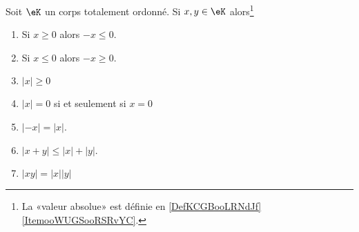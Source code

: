 \begin{lemma}  \label{LemooANTJooYxQZDw}
	Soit \( \eK\) un corps totalement ordonné. Si \( x,y\in \eK\) alors\footnote{La «valeur absolue» est définie en \eqref{DefKCGBooLRNdJf}\ref{ItemooWUGSooRSRvYC}.}
	\begin{enumerate}
		\item       \label{ItemooNVDIooSuiSoB}
		      Si \( x\geq 0\) alors \( -x\leq 0\).
		\item       \label{ITEMooVNAZooSxmtuH}
		      Si \( x\leq 0\) alors \( -x\geq 0\).
		\item       \label{ITEMooSDNHooDnjScE}
		      \( | x |\geq 0\)
		\item       \label{ITEMooLQLTooTJTPVM}
		      \( | x |=0\) si et seulement si \( x=0\)
		\item       \label{ITEMooVJAEooOEatzY}
		      \( | -x |=| x |\).
		      \item\label{ItemooOMKNooRlanvk}
		      \( | x+y |\leq | x |+| y |\).
		      \item\label{ITEMooEFMLooYVCuHD}
		      \( | xy |=| x | |y |\)
	\end{enumerate}
\end{lemma}

